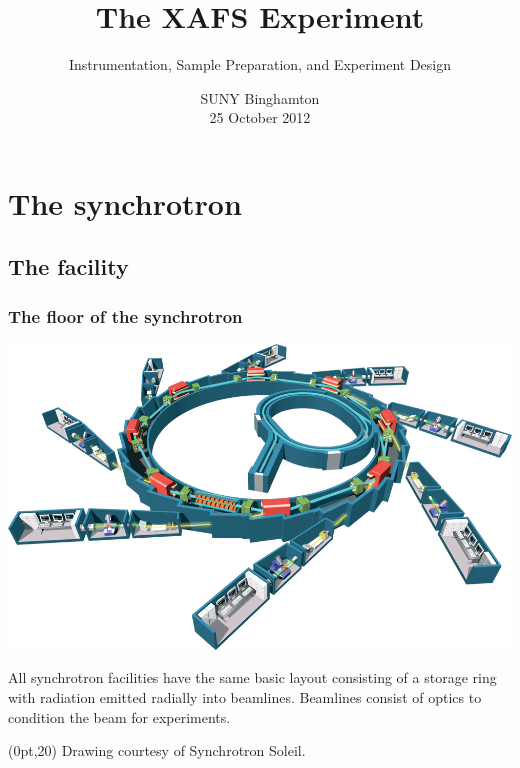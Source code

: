 \documentclass[10pt, xcolor=x11names, compress]{beamer}
\title{The XAFS Experiment}
\subtitle[]{Instrumentation, Sample Preparation, and Experiment
  Design}
\date{SUNY Binghamton\\25 October 2012}
\begin{document}
\maketitle


\section{The synchrotron}
\label{sec:synch}

\subsection{The facility}

\begin{frame}
  \frametitle{The floor of the synchrotron}
  
  \begin{center}
    \includegraphics[width=0.8\linewidth]{synch/SOL008h.jpg}
    
    \smallskip

    All synchrotron facilities have the same basic layout consisting
    of a storage ring with radiation emitted radially into beamlines.
    Beamlines consist of optics to condition the beam for experiments.
  \end{center}
  \begin{textblock*}{0.5\linewidth}(0pt,20\TPVertModule)%
    \tiny%
    Drawing courtesy of Synchrotron Soleil.
  \end{textblock*}
\end{frame}
\end{document}

